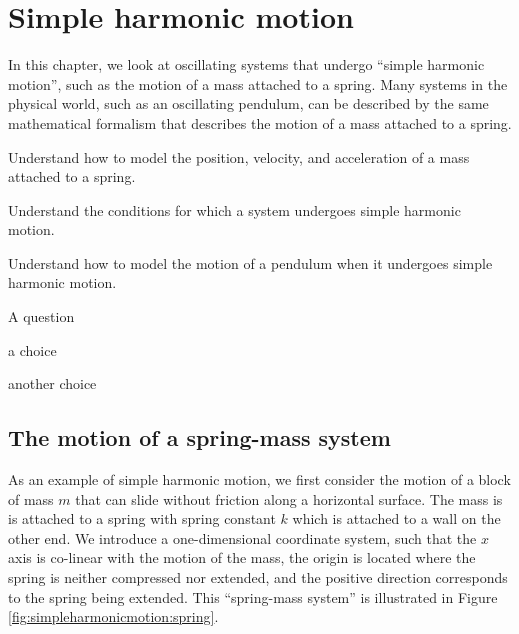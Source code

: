 
\chapter{Simple harmonic motion}
\label{chapter:simpleharmonicmotion}
In this chapter, we look at oscillating systems that undergo ``simple harmonic motion'', such as the motion of a mass attached to a spring. Many systems in the physical world, such as an oscillating pendulum, can be described by the same mathematical formalism that describes the motion of a mass attached to a spring. 

\begin{learningObjectives}{
 \item Understand how to model the position, velocity, and acceleration of a mass attached to a spring.
 \item Understand the conditions for which a system undergoes simple harmonic motion.
 \item Understand how to model the motion of a pendulum when it undergoes simple harmonic motion.
 }
\end{learningObjectives}

\begin{opening}
\begin{MCquestion}{A question}
\item a choice
\item another choice %
\end{MCquestion}
\end{opening}

\section{The motion of a spring-mass system}
As an example of simple harmonic motion, we first consider the motion of a block of mass $m$ that can slide without friction along a horizontal surface. The mass is is attached to a spring with spring constant $k$ which is attached to a wall on the other end. We introduce a one-dimensional coordinate system, such that the $x$ axis is co-linear with the motion of the mass, the origin is located where the spring is neither compressed nor extended, and the positive direction corresponds to the spring being extended. This ``spring-mass system'' is illustrated in Figure \ref{fig:simpleharmonicmotion:spring}.

